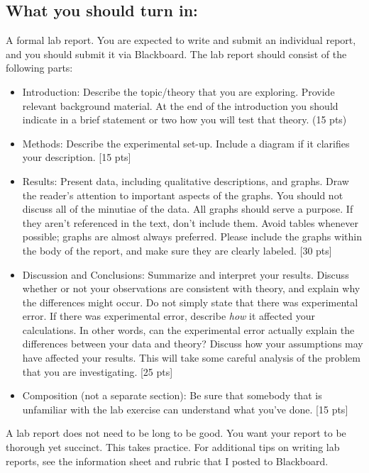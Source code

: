 \documentclass[11pt,letterpaper]{article}
\begin{document}
\subsection*{What you should turn in:} A formal lab report. You are expected to write and submit an individual report, and you should submit it via Blackboard. The lab report should consist of the following parts:
\begin{itemize}
\item Introduction: Describe the topic/theory that you are exploring. Provide relevant background material. At the end of the introduction you should indicate in a brief statement or two how you will test that theory. (15 pts)
\item Methods: Describe the experimental set-up. Include a diagram if it clarifies your description. [15 pts]
\item Results: Present data, including qualitative descriptions, and graphs. Draw the reader's attention to
important aspects of the graphs. You should not discuss all of the minutiae of the data. All graphs should serve a purpose. If they aren't referenced in the text, don't include them. Avoid tables whenever possible; graphs are almost always preferred. Please include the graphs within the body of the report, and make sure they are clearly labeled. [30 pts]
\item Discussion and Conclusions: Summarize and interpret your results. Discuss whether or not your observations are consistent with theory, and explain why the differences might occur. Do not simply state that
there was experimental error. If there was experimental error, describe \textit{how} it affected your
calculations. In other words, can the experimental error actually explain the differences between your data and theory? Discuss how your assumptions may have affected your results. This will take some careful analysis of the problem that you are investigating. [25 pts]
\item Composition (not a separate section): Be sure that somebody that is unfamiliar with the lab exercise can understand what you've done. [15 pts]
\end{itemize}


A lab report does not need to be long to be good. You want your report to be thorough yet succinct. This takes practice. For additional tips on writing lab reports, see the information sheet  and rubric that I posted to Blackboard.\\
\end{document}
